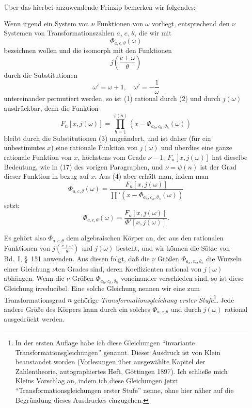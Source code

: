 \documentclass[12pt,a4paper]{article}
\theoremstyle{definition}
\begin{document}
Über das hierbei anzuwendende Prinzip bemerken wir folgendes:

Wenn irgend ein System von $\nu$ Funktionen von $\omega$ vorliegt, entsprechend den $\nu$ Systemen von Transformationszahlen $a$, $c$, $\theta$, die wir mit
\begin{equation}\label{eq:70-1}
\Phi_{a,c,\theta}(\omega)
\end{equation}
bezeichnen wollen und die isomorph mit den Funktionen
\begin{equation}\label{eq:70-2}
j\left(\frac{c + \omega}{\theta}\right)
\end{equation}
durch die Substitutionen
\begin{equation}\label{eq:70-3}
\omega' = \omega + 1, \quad \omega' = -\frac{1}{\omega}
\end{equation}
untereinander permutiert werden, so ist (1) rational durch (2) und durch $j(\omega)$ ausdrückbar, denn die Funktion
\begin{equation}\label{eq:70-4}
F_n[x, j(\omega)] = \prod_{h=1}^{\psi(n)} \left(x - \Phi_{a_h,c_h,\theta_h}(\omega)\right)
\end{equation}
bleibt durch die Substitutionen (3) ungeändert, und ist daher (für ein unbestimmtes $x$) eine rationale Funktion von $j(\omega)$ und überdies eine ganze rationale Funktion von $x$, höchstens vom Grade $\nu - 1$; $F_n[x, j(\omega)]$ hat dieselbe Bedeutung, wie in (17) des vorigen Paragraphen, und $\nu = \psi(n)$ ist der Grad dieser Funktion in bezug auf $x$. Aus (4) aber erhält man, indem man
\[
\Phi_{a,c,\theta}(\omega) = \frac{F_n[x, j(\omega)]}{\prod' (x - \Phi_{a_h,c_h,\theta_h}(\omega))}
\]
setzt:
\begin{equation}\label{eq:70-5}
\Phi_{a,c,\theta}(\omega) = \frac{F_n[x, j(\omega)]}{\Phi'[x, j(\omega)]}.
\end{equation}

Es gehört also $\Phi_{a,c,\theta}$ dem algebraischen Körper an, der aus den rationalen Funktionen von $j(\frac{c + \omega}{\theta})$ und $j(\omega)$ besteht, und wir können die Sätze von Bd.~I, \S\ 151 anwenden. Aus diesen folgt, daß die $\nu$ Größen $\Phi_{a_h,c_h,\theta_h}$ die Wurzeln einer Gleichung $\nu$ten Grades sind, deren Koeffizienten rational von $j(\omega)$ abhängen. Wenn die $\nu$ Größen $\Phi_{a_h,c_h,\theta_h}$ voneinander verschieden sind, so ist diese Gleichung irreducibel. Eine solche Gleichung nennen wir eine zum Transformationsgrad $n$ gehörige \emph{Transformationsgleichung erster Stufe}{}\footnote{In der ersten Auflage habe ich diese Gleichungen ``invariante Transformationsgleichungen'' genannt. Dieser Ausdruck ist von Klein beanstandet worden (Vorlesungen über ausgewählte Kapitel der Zahlentheorie, autographiertes Heft, Göttingen 1897). Ich schließe mich Kleins Vorschlag an, indem ich diese Gleichungen jetzt ``Transformationsgleichungen erster Stufe'' nenne, ohne hier näher auf die Begründung dieses Ausdruckes einzugehen.}. Jede andere Größe des Körpers kann durch ein solches $\Phi_{a,c,\theta}$ und durch $j(\omega)$ rational ausgedrückt werden.
\end{document}
